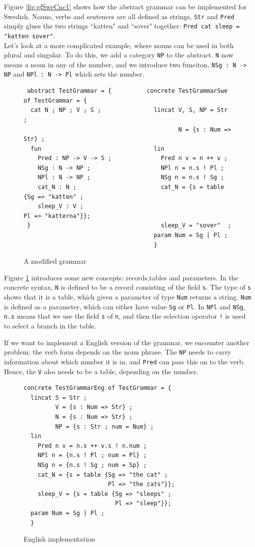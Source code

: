 \documentclass{report}
\begin{document}
Figure \ref{fig:gfSweCnc1} shows how the abstract grammar can be implemented
for Swedish. Nouns, verbs and sentences are all defined as strings, \verb|Str|
and \verb|Pred| simply glues the two strings ``katten" and ``sover" together:
\verb|Pred cat sleep = "katten sover"|.\\
Let's look at a more complicated example, where nouns can be used in both
plural and singular. To do this, we add a category \verb|NP| to the
abstract. \verb|N| now means a noun
in any of the number, and we introduce two funciton, \verb|NSg : N -> NP| and
\verb|NPl : N -> Pl| which sets the number.
\begin{figure}[h!]
\begin{verbatim}              
 abstract TestGrammar = {          concrete TestGrammarSwe of TestGrammar = {
  cat N ; NP ; V ; S ;               lincat V, S, NP = Str ;
                                            N = {s : Num => Str} ;
  fun                                lin   
    Pred : NP -> V -> S ;              Pred n v = n ++ v ;
    NSg : N -> NP ;                    NPl n = n.s ! Pl ;
    NPl : N -> NP ;                    NSg n = n.s ! Sg ;
    cat_N : N ;                        cat_N = {s = table {Sg => "katten" ;
    sleep_V : V ;                                          Pl => "katterna"}};
 }                                     sleep_V = "sover"  ;
                                     param Num = Sg | Pl ;
                                     }
\end{verbatim}           
\caption{A modified grammar}
\label{fig:gfTest2}
\end{figure}
Figure \ref{fig:gfTest2} introduces some new concepts: records,tables and parameters.
In the concrete syntax, \verb|N| is defined to be a record consisting of the field
\verb|s|. The type of \verb|s| shows that it is a table, which given a parameter of type \verb|Num| returns
a string. \verb|Num| is defined as a parameter, which can either have value \verb|Sg|
or \verb|Pl|. In \verb|NPl| and \verb|NSg|, \verb|n.s| means that we use the
field \verb|s| of \verb|n|, and then the selection operator \verb|!| is used to
select a branch in the table.

If we want to implement a English version of the grammar, we encounter another
problem: the verb form depends on the noun phrase. The \verb|NP| needs to carry
information about which number it is in, and \verb|Pred| can pass this on to the
verb. Hence, the \verb|V| also needs to be a table, depending on the number.
\begin{figure}[h!]
\begin{verbatim}              
concrete TestGrammarEng of TestGrammar = {
  lincat S = Str ;
         V = {s : Num => Str} ;
         N = {s : Num => Str} ;
         NP = {s : Str ; num = Num} ;
  lin   
    Pred n v = n.s ++ v.s ! n.num ;
    NPl n = {n.s ! Pl ; num = Pl} ;
    NSg n = {n.s ! Sg ; num = Sp} ;
    cat_N = {s = table {Sg => "the cat" ;
                        Pl => "the cats"}};
    sleep_V = {s = table {Sg => "sleeps" ; 
                          Pl => "sleep"}};
  param Num = Sg | Pl ;
  }
\end{verbatim}           
\caption{English implementation}
\label{fig:gfTestEng}
\end{figure}
\end{document}
